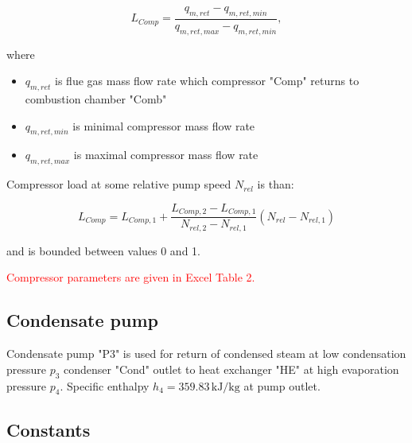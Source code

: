 \documentclass[openany]{book}
\begin{document}
	\begin{equation}\label{eq:compressor_load}
	L_{Comp} = \frac{q_{m,ret} - q_{m,ret,min}}{q_{m,ret,max} - q_{m,ret,min}},
	\end{equation}
	
	\noindent
	where
	
	\begin{itemize}
		\item $q_{m,ret}$ is flue gas mass flow rate which compressor "Comp" 
		returns to combustion chamber "Comb"
		\item $q_{m,ret,min}$ is minimal compressor mass flow rate
		\item $q_{m,ret,max}$ is maximal compressor mass flow rate	
	\end{itemize}
	
	\noindent
	Compressor load at some relative pump speed $N_{rel}$ is than:
	
	\begin{equation}\label{eq:compressor_load_rel}
	L_{Comp} = L_{Comp,1} + \frac{L_{Comp,2} - L_{Comp,1}}{N_{rel,2} - 
	N_{rel,1}} \left( N_{rel} - N_{rel,1}\right)
	\end{equation}
	
	\noindent
	and is bounded between values 0 and 1.
	
	\noindent
	\textcolor{red}{Compressor parameters are given in Excel Table 2.}
	
	\subsection{Condensate pump}
	
	Condensate pump "P3" is used for return of condensed steam at low 
	condensation pressure $p_3$ condenser "Cond" outlet to heat exchanger "HE" 
	at high evaporation pressure $p_4$.
	Specific enthalpy $h_4 = 359.83 \,\textrm{kJ/kg}$ at pump outlet.
	
	\subsection{Constants} \label{sec:const}
	
\end{document}
